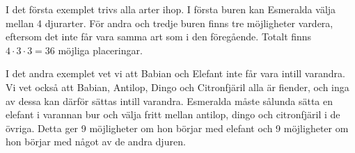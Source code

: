 I det första exemplet trivs alla arter ihop. I första buren kan Esmeralda välja mellan 4 djurarter. För andra och tredje buren finns tre möjligheter vardera, eftersom det inte får vara samma art som i den föregående. Totalt finns $4\cdot 3\cdot 3=36$ möjliga placeringar.

I det andra exemplet vet vi att Babian och Elefant inte får vara intill varandra. Vi vet också att Babian, Antilop, Dingo och Citronfjäril alla är fiender, och inga av dessa kan därför sättas intill varandra. Esmeralda måste sålunda sätta en elefant i varannan bur och välja fritt mellan antilop, dingo och citronfjäril i de övriga. Detta ger 9 möjligheter om hon börjar med elefant och 9 möjligheter om hon börjar med något av de andra djuren.
